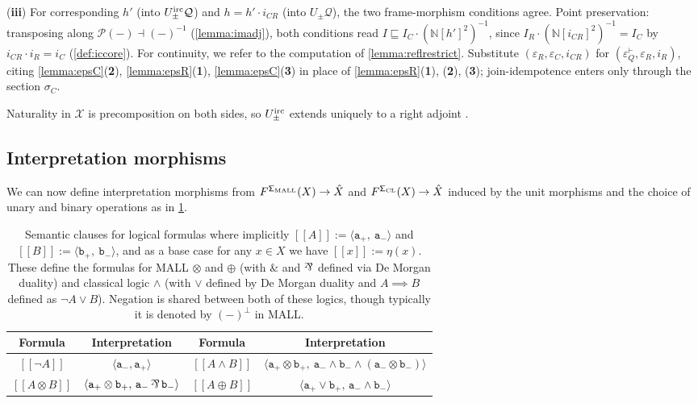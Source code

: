 \documentclass{article}
\theoremstyle{definition}
\DeclareMathOperator{\parr}{\rotatebox[origin=c]{180}{\&}}
\newcommand{\N}{\mathbb{N}}
\newcommand{\cP}{\mathcal{P}}
\newcommand{\cQ}{\mathcal{Q}}
\newcommand{\cX}{\mathcal{X}}
\newcommand{\cat}[1]{\mathsf{#1}}
\newcommand{\bbrack}[1]{[\![ #1 ]\!]}
\begin{document}
{({\bf iii}) For corresponding $h'$ (into $U^{\rm irc}_\pm\cQ$) and $h=h'\cdot i_{CR}$ (into $U_\pm\cQ$), the two frame-morphism conditions agree. 
Point preservation: transposing along $\cP(-)\dashv(-)^{-1}$ (\cref{lemma:imadj}), both conditions read $I\sqsubseteq I_C\cdot(\N[h']^2)^{-1}$, since $I_R\cdot(\N[i_{CR}]^2)^{-1}=I_C$ by $i_{CR}\cdot i_R=i_C$ (\cref{def:iccore}). 
For continuity, we refer to the computation of \cref{lemma:reflrestrict}. 
Substitute $(\varepsilon_R,\varepsilon_C,i_{CR})$ for $(\varepsilon^\vdash_Q,\varepsilon_R,i_R)$, citing \cref{lemma:epsC}({\bf 2}), \cref{lemma:epsR}({\bf 1}),
\cref{lemma:epsC}({\bf 3}) in place of \cref{lemma:epsR}({\bf 1}), ({\bf 2}), ({\bf 3}); join-idempotence enters only through the section $\sigma_C$. 

Naturality in $\cX$ is precomposition on both sides, so $U^{\rm irc}_\pm$ extends uniquely to a right adjoint \cite[IV.1, Thm~2]{mclane}.
}
\subsection{Interpretation morphisms}


We can now define interpretation morphisms from $F^\cat{\Sigma_{\rm MALL}}(X)\to \hat X$ and $F^\cat{\Sigma_{\rm CL}}(X)\to \hat X$ induced by the unit morphisms and the choice of unary and binary operations as in \cref{tab:connectives}. 


\begin{table}[h]
\centering
\begin{tabular}{||c|c@{\quad}||@{\quad}c|c||}
\hline
\textbf{Formula} & \textbf{Interpretation} 
& \textbf{Formula} & \textbf{Interpretation} \\
\hline
$\bbrack{\neg A}$
& $\langle \texttt{a}_-, \texttt{a}_+ \rangle$
&
$\bbrack{A \wedge B}$
& $\langle \texttt{a}_+ \otimes \texttt{b}_+,\ \texttt{a}_-\wedge \texttt{b}_- \wedge (\texttt{a}_-\otimes \texttt{b}_-)\rangle$
\\[6pt]
$\bbrack{A \otimes B}$
& $\langle \texttt{a}_+ \otimes \texttt{b}_+,\, \texttt{a}_- \parr \texttt{b}_- \rangle$
&
$\bbrack{A \oplus B}$
& $\langle \texttt{a}_+ \vee \texttt{b}_+,\, \texttt{a}_- \wedge \texttt{b}_- \rangle$
\\[6pt]
\hline
\end{tabular}

\caption{Semantic clauses for logical formulas where implicitly $\bbrack{A}:=\langle \texttt{a}_+,\ \texttt{a}_-\rangle$ and $\bbrack{B}:=\langle \texttt{b}_+,\ \texttt{b}_-\rangle$, and as a base case for any $x \in X$ we have $\bbrack{x}:=\eta(x)$. These define the formulas for MALL $\otimes$ and $\oplus$ (with $\&$ and $\parr$ defined via De Morgan duality) and classical logic $\wedge$ (with $\vee$ defined by De Morgan duality and $A \implies B$ defined as ${\neg A \vee B}$). Negation is shared between both of these logics, though typically it is denoted by $(-)^\bot$ in MALL.}
\label{tab:connectives}
\end{table}
\end{document}
